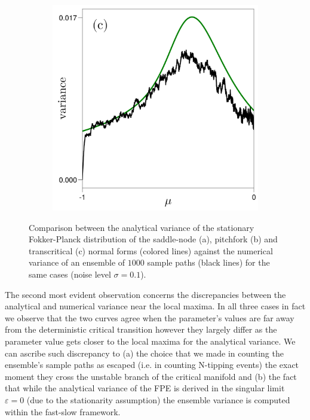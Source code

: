 \documentclass[../main.tex]{subfiles}
\begin{document}
\begin{figure}[H]
\begin{subfigure}[b]{0.3\textwidth}
        \label{fig3.5.2}
    \end{subfigure}
    \hfill
    \begin{subfigure}[b]{0.3\textwidth}
        \centering 
        \includegraphics[keepaspectratio, width = \textwidth]{../figures/fig3.5.3.png}
        \label{fig3.5.3}
    \end{subfigure}
    \caption{Comparison between the analytical variance of the stationary Fokker-Planck distribution of the saddle-node (a), pitchfork (b) and transcritical (c) normal forms (colored lines) against the numerical variance of an ensemble of $1000$ sample paths (black lines) for the same cases (noise level $\sigma = 0.1$).}
    \label{fig3.5}
\end{figure}
The second most evident observation concerns the discrepancies between the analytical and numerical variance near the local maxima. In all three cases in fact we observe that the two curves agree when the parameter's values are far away from the deterministic critical transition however they largely differ as the parameter value gets closer to the local maxima for the analytical variance.
We can ascribe such discrepancy to (a) the choice that we made in counting the ensemble's sample paths as escaped (i.e. in counting N-tipping events) the exact moment they cross the unstable branch of the critical manifold and (b) the fact that while the analytical variance of the FPE is derived in the singular limit $\varepsilon=0$ (due to the stationarity assumption) the ensemble variance is computed within the fast-slow framework.
\end{document}
